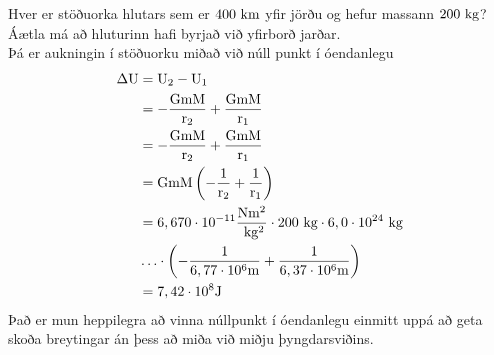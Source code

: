 \begin{formalexample}
Hver er stöðuorka hlutars sem er $400 \textrm{ k}\textrm{m}$ yfir jörðu og hefur
massann $200 \textrm{ k}\textrm{g}$? Áætla má að hluturinn hafi byrjað við yfirborð jarðar.
\\[4 ex]
Þá er aukningin í stöðuorku miðað við núll punkt í óendanlegu
\begin{align*}
	\Delta \textrm{U} &= \textrm{U}_2 - \textrm{U}_1 \\
		&= -\frac{\text{G} \textrm{m} \textrm{M}}{\textrm{r}_2}
			+ \frac{\text{G} \textrm{m} \textrm{M}}{\textrm{r}_1} \\
		&= -\frac{\text{G} \textrm{m} \textrm{M}}{\textrm{r}_2}
			+ \frac{\text{G} \textrm{m} \textrm{M}}{\textrm{r}_1} \\
		&= \text{G} \textrm{m} \textrm{M} \left(-\frac{1}{\textrm{r}_2}
			+ \frac{1}{\textrm{r}_1}  \right) \\
		&= 6,670 \cdot 10^{-11} \frac{\textrm{N} \textrm{m}^2}{\textrm{ k}\textrm{g}^2} \cdot 200 \textrm{ k}\textrm{g} \cdot 6,0 \cdot 10^{24} \textrm{ k}\textrm{g} \\
		&\ldots \cdot \left(-\frac{1}{6,77 \cdot 10^{6} \textrm{m}}
			+ \frac{1}{6,37 \cdot 10^{6} \textrm{m}}  \right) \\
		&= 7,42 \cdot 10^{8} \textrm{J}
\end{align*}
Það er mun heppilegra að vinna núllpunkt í óendanlegu einmitt uppá að
geta skoða breytingar án þess að miða við miðju þyngdarsviðins.
\end{formalexample}
